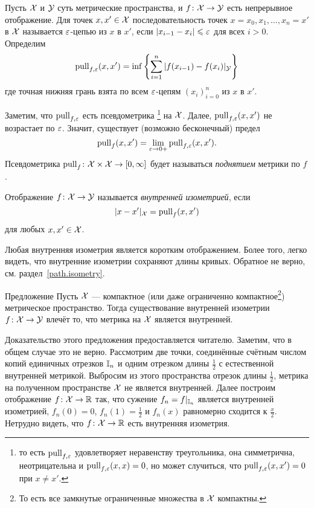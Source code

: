 \documentclass[oneside,a4paper]{article}
\begin{document}
Пусть $\mathcal{X}$ и $\mathcal{Y}$ суть метрические пространства, 
и $f\colon\mathcal{X}\to \mathcal{Y}$ есть 
непрерывное отображение.
Для точек $x,x'\in \mathcal{X}$ последовательность точек $x=x_0,x_1,\dots,x_n=x'$ в $\mathcal{X}$ называется $\varepsilon$-цепью из $x$ в $x'$, если $|x_{i-1}-x_i|\leqslant\varepsilon$ для всех $i>0$.
Определим
$$\mathop{\rm pull}\nolimits_{f,\varepsilon}(x,x')
=
\inf\left\{\sum_{i=1}^n|f(x_{i-1})-f(x_{i})|_{\mathcal{Y}}\right\}$$
где точная нижняя грань взята по всем $\varepsilon$-цепям $(x_i)_{i=0}^n$ из $x$ в $x'$.

Заметим, что $\mathop{\rm pull}\nolimits_{f,\varepsilon}$ есть псевдометрика%
\footnote{то есть $\mathop{\rm pull}\nolimits_{f,\varepsilon}$ удовлетворяет неравенству треугольника, она симметрична, неотрицательна и $\mathop{\rm pull}\nolimits_{f,\varepsilon}(x,x)=0$, но может случиться, что $\mathop{\rm pull}\nolimits_{f,\varepsilon}(x,x')=0$ при $x\not=x'$.}
на $\mathcal{X}$.
Далее, 
$\mathop{\rm pull}\nolimits_{f,\varepsilon}(x,x')$ не возрастает по $\varepsilon$.
Значит, существует (возможно бесконечный) предел
$$\mathop{\rm pull}\nolimits_{f}(x,x')=\lim_{\varepsilon\to0+}\mathop{\rm pull}\nolimits_{f,\varepsilon}(x,x').$$
Псевдометрика $\mathop{\rm pull}\nolimits_f\colon\mathcal{X}\times\mathcal{X}\to[0,\infty]$ будет называться \emph{поднятием} метрики по $f$.

Отображение $f\colon\mathcal{X}\to \mathcal{Y}$ называется \emph{внутренней изометрией}, если 
$$|x-x'|_{\mathcal{X}}=\mathop{\rm pull}\nolimits_f(x,x')$$
для любых $x,x'\in \mathcal{X}$.

Любая внутренняя изометрия является коротким отображением.
Более того, легко видеть, что внутренние изометрии сохраняют длины кривых.
Обратное не верно, см. раздел~\ref{path.isometry}.

\begin{thm}{Предложение}\label{int>int}
Пусть $\mathcal{X}$ --- компактное (или даже ограниченно компактное\footnote{То есть все замкнутые ограниченные множества в $\mathcal{X}$ компактны.}) метрическое пространство.
Тогда существование внутренней изометрии $f\colon\mathcal{X}\to \mathcal{Y}$ влечёт то, что метрика на $\mathcal{X}$ является внутренней.
\end{thm}

Доказательство этого предложения предоставляется читателю.
Заметим, что в общем случае это не верно.
Рассмотрим две точки, соединённые счётным числом копий единичных отрезков $\mathbb{I}_n$ и одним отрезком длины $\frac12$ с естественной внутренней метрикой.
Выбросим из этого пространства отрезок длины $\frac12$,
метрика на полученном пространстве $\mathcal{X}$ не является внутренней.
Далее построим отображение $f\colon\mathcal{X}\to\mathbb{R}$ так, что сужение $f_n=f|_{\mathbb{I}_n}$ является внутренней изометрией, $f_n(0)=0$, $f_n(1)=\tfrac12$ и $f_n(x)$ равномерно сходится к $\tfrac x2$.
Нетрудно видеть, что $f\colon\mathcal{X}\to\mathbb{R}$ есть внутренняя изометрия.
\end{document}
